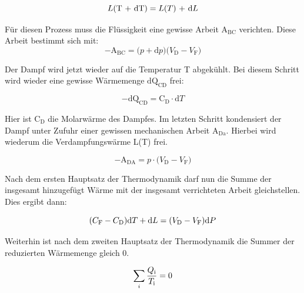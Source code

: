 \begin{equation}
L\text{(T + dT)} = L\text{(}T\text{) + d}L\nonumber\\
\end{equation}

\noindent Für diesen Prozess muss die Flüssigkeit eine gewisse Arbeit $\text{A}_\text{BC}$ verichten. Diese Arbeit bestimmt sich mit:\\

\begin{equation}
   - \text{A}_\text{BC} = \text{(}p + \text{d}p\text{)(}V_\text{D} - V_\text{F}\text{)} \nonumber
\end{equation}

\noindent Der Dampf wird jetzt wieder auf die Temperatur T abgekühlt.
Bei diesem Schritt wird wieder eine gewisse Wärmemenge $\text{dQ}_\text{CD}$ frei:

\begin{equation}
 -\text{dQ}_\text{CD} =\text{C}_\text{D}\cdot \text{d}T  \nonumber
\end{equation}

\noindent Hier ist $\text{C}_\text{D}$ die Molarwärme des Dampfes.
Im letzten Schritt kondensiert der Dampf unter Zufuhr einer gewissen mechanischen Arbeit $\text{A}_\text{Da}$.
Hierbei wird wiederum die Verdampfungswärme L(T) frei.

\begin{equation}
    -\text{A}_\text{DA}= p\cdot\text{(}V_\text{D} - V_\text{F}\text{)}  \nonumber
\end{equation}



\noindent Nach dem ersten Hauptsatz der Thermodynamik darf nun die Summe der insgesamt hinzugefügt Wärme mit der insgesamt 
verrichteten Arbeit gleichstellen. Dies ergibt dann:    

\begin{equation}
    (C_\text{F}-C_\text{D}\text{)d}T + \text{d}L = \text{(}V_\text{D}-V_\text{F}\text{)d}P\\
    \label{eqn:wearme=Arbeit}
\end{equation}

\noindent Weiterhin ist nach dem zweiten Hauptsatz der Thermodynamik die Summer der reduzierten Wärmemenge gleich 0.

\begin{equation}
    \sum_{i}\frac{Q_\text{i}}{T_\text{i}}=0\nonumber\\
\end{equation}


